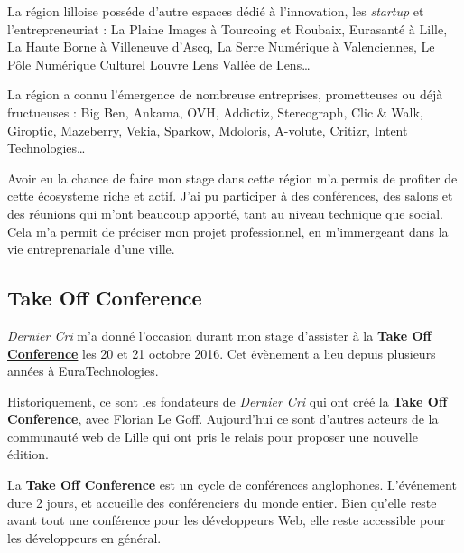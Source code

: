 \documentclass[12pt,a4paper]{article}
\begin{document}
  \bigskip

  La région lilloise posséde d'autre espaces dédié à l'innovation, les
  \emph{startup} et l'entrepreneuriat : La Plaine Images à Tourcoing et
  Roubaix, Eurasanté à Lille, La Haute Borne à Villeneuve d'Ascq, La Serre
  Numérique à Valenciennes, Le Pôle Numérique Culturel Louvre Lens Vallée
  de Lens\ldots{}

  \bigskip

  La région a connu l'émergence de nombreuse entreprises, prometteuses ou
  déjà fructueuses : Big Ben, Ankama, OVH, Addictiz, Stereograph, Clic \&
  Walk, Giroptic, Mazeberry, Vekia, Sparkow, Mdoloris, A-volute, Critizr,
  Intent Technologies\ldots{}

  \bigskip

  Avoir eu la chance de faire mon stage dans cette région m'a permis de
  profiter de cette écosysteme riche et actif. J'ai pu participer à des
  conférences, des salons et des réunions qui m'ont beaucoup apporté, tant
  au niveau technique que social. Cela m'a permit de préciser mon projet
  professionnel, en m'immergeant dans la vie entreprenariale d'une ville.

  \bigskip

  \subsection{Take Off Conference}\label{take-off-conference}

  \bigskip

  \emph{Dernier Cri} m'a donné l'occasion durant mon stage d'assister à la
  \href{http://takeoffconf.com/2016}{\textbf{Take Off Conference}} les 20
  et 21 octobre 2016. Cet évènement a lieu depuis plusieurs années à
  EuraTechnologies.

  \bigskip

  Historiquement, ce sont les fondateurs de \emph{Dernier Cri} qui ont
  créé la \textbf{Take Off Conference}, avec Florian Le Goff. Aujourd'hui
  ce sont d'autres acteurs de la communauté web de Lille qui ont pris le
  relais pour proposer une nouvelle édition.

  \bigskip

  La \textbf{Take Off Conference} est un cycle de conférences anglophones.
  L'événement dure 2 jours, et accueille des conférenciers du monde
  entier. Bien qu'elle reste avant tout une conférence pour les
  développeurs Web, elle reste accessible pour les développeurs en
  général.

  \bigskip
\end{document}
